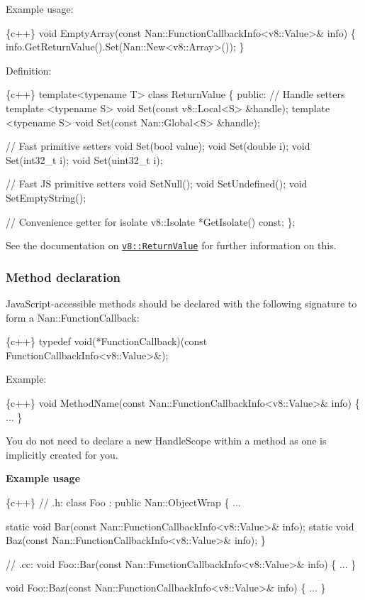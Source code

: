 Example usage\+:


\begin{DoxyCode}
\{c++\}
void EmptyArray(const Nan::FunctionCallbackInfo<v8::Value>& info) \{
  info.GetReturnValue().Set(Nan::New<v8::Array>());
\}
\end{DoxyCode}


Definition\+:


\begin{DoxyCode}
\{c++\}
template<typename T> class ReturnValue \{
 public:
  // Handle setters
  template <typename S> void Set(const v8::Local<S> &handle);
  template <typename S> void Set(const Nan::Global<S> &handle);

  // Fast primitive setters
  void Set(bool value);
  void Set(double i);
  void Set(int32\_t i);
  void Set(uint32\_t i);

  // Fast JS primitive setters
  void SetNull();
  void SetUndefined();
  void SetEmptyString();

  // Convenience getter for isolate
  v8::Isolate *GetIsolate() const;
\};
\end{DoxyCode}


See the documentation on \href{https://v8docs.nodesource.com/io.js-3.0/da/da7/classv8_1_1_return_value.html}{\tt {\ttfamily v8\+::\+Return\+Value}} for further information on this.

\label{_api_nan_method}%
 \subsubsection*{Method declaration}

Java\+Script-\/accessible methods should be declared with the following signature to form a {\ttfamily Nan\+::\+Function\+Callback}\+:


\begin{DoxyCode}
\{c++\}
typedef void(*FunctionCallback)(const FunctionCallbackInfo<v8::Value>&);
\end{DoxyCode}


Example\+:


\begin{DoxyCode}
\{c++\}
void MethodName(const Nan::FunctionCallbackInfo<v8::Value>& info) \{
  ...
\}
\end{DoxyCode}


You do not need to declare a new {\ttfamily Handle\+Scope} within a method as one is implicitly created for you.

{\bfseries Example usage}


\begin{DoxyCode}
\{c++\}
// .h:
class Foo : public Nan::ObjectWrap \{
  ...

  static void Bar(const Nan::FunctionCallbackInfo<v8::Value>& info);
  static void Baz(const Nan::FunctionCallbackInfo<v8::Value>& info);
\}


// .cc:
void Foo::Bar(const Nan::FunctionCallbackInfo<v8::Value>& info) \{
  ...
\}

void Foo::Baz(const Nan::FunctionCallbackInfo<v8::Value>& info) \{
  ...
\}
\end{DoxyCode}


